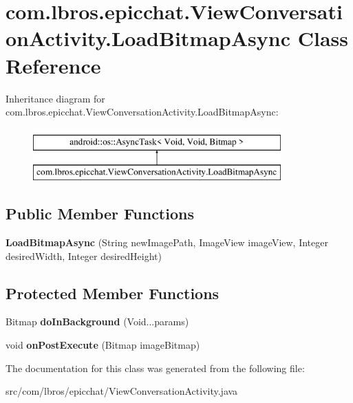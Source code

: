 \hypertarget{classcom_1_1lbros_1_1epicchat_1_1_view_conversation_activity_1_1_load_bitmap_async}{\section{com.\-lbros.\-epicchat.\-View\-Conversation\-Activity.\-Load\-Bitmap\-Async Class Reference}
\label{classcom_1_1lbros_1_1epicchat_1_1_view_conversation_activity_1_1_load_bitmap_async}
}
Inheritance diagram for com.\-lbros.\-epicchat.\-View\-Conversation\-Activity.\-Load\-Bitmap\-Async\-:\begin{figure}[H]
\begin{center}
\leavevmode
\includegraphics[height=2.000000cm]{classcom_1_1lbros_1_1epicchat_1_1_view_conversation_activity_1_1_load_bitmap_async}
\end{center}
\end{figure}
\subsection*{Public Member Functions}
\begin{DoxyCompactItemize}
\item 
\hypertarget{classcom_1_1lbros_1_1epicchat_1_1_view_conversation_activity_1_1_load_bitmap_async_a9a02a7bcd787994dc58adabd6d2861cd}{{\bfseries Load\-Bitmap\-Async} (String new\-Image\-Path, Image\-View image\-View, Integer desired\-Width, Integer desired\-Height)}\label{classcom_1_1lbros_1_1epicchat_1_1_view_conversation_activity_1_1_load_bitmap_async_a9a02a7bcd787994dc58adabd6d2861cd}

\end{DoxyCompactItemize}
\subsection*{Protected Member Functions}
\begin{DoxyCompactItemize}
\item 
\hypertarget{classcom_1_1lbros_1_1epicchat_1_1_view_conversation_activity_1_1_load_bitmap_async_aea42884c47d866afecce294955342884}{Bitmap {\bfseries do\-In\-Background} (Void...\-params)}\label{classcom_1_1lbros_1_1epicchat_1_1_view_conversation_activity_1_1_load_bitmap_async_aea42884c47d866afecce294955342884}

\item 
\hypertarget{classcom_1_1lbros_1_1epicchat_1_1_view_conversation_activity_1_1_load_bitmap_async_a46b07297177ea00058a3a0ce374e9ef3}{void {\bfseries on\-Post\-Execute} (Bitmap image\-Bitmap)}\label{classcom_1_1lbros_1_1epicchat_1_1_view_conversation_activity_1_1_load_bitmap_async_a46b07297177ea00058a3a0ce374e9ef3}

\end{DoxyCompactItemize}


The documentation for this class was generated from the following file\-:\begin{DoxyCompactItemize}
\item 
src/com/lbros/epicchat/View\-Conversation\-Activity.\-java\end{DoxyCompactItemize}
